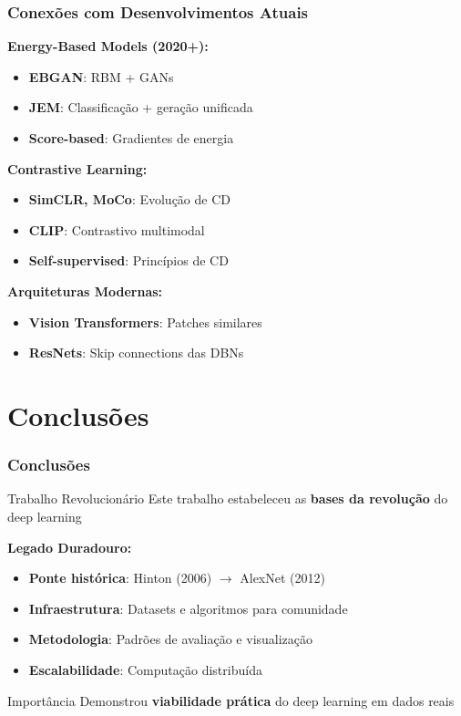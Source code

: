 \documentclass[aspectratio=169]{beamer}
\begin{document}
\begin{frame}
\frametitle{Conexões com Desenvolvimentos Atuais}
\textbf{Energy-Based Models (2020+):}
\begin{itemize}
    \item \textcolor{azulescuro}{\textbf{EBGAN}}: RBM + GANs
    \item \textcolor{azulescuro}{\textbf{JEM}}: Classificação + geração unificada
    \item \textcolor{azulescuro}{\textbf{Score-based}}: Gradientes de energia
\end{itemize}

\textbf{Contrastive Learning:}
\begin{itemize}
    \item \textcolor{azulescuro}{\textbf{SimCLR, MoCo}}: Evolução de CD
    \item \textcolor{azulescuro}{\textbf{CLIP}}: Contrastivo multimodal
    \item \textcolor{azulescuro}{\textbf{Self-supervised}}: Princípios de CD
\end{itemize}

\textbf{Arquiteturas Modernas:}
\begin{itemize}
    \item \textcolor{azulescuro}{\textbf{Vision Transformers}}: Patches similares
    \item \textcolor{azulescuro}{\textbf{ResNets}}: Skip connections das DBNs
\end{itemize}
\end{frame}

\section{Conclusões}

\begin{frame}
\frametitle{Conclusões}
\begin{alertblock}{Trabalho Revolucionário}
Este trabalho estabeleceu as \textcolor{azulescuro}{\textbf{bases da revolução}} do deep learning
\end{alertblock}

\textbf{Legado Duradouro:}
\begin{itemize}
    \item \textcolor{azulescuro}{\textbf{Ponte histórica}}: Hinton (2006) $\rightarrow$ AlexNet (2012)
    \item \textcolor{azulescuro}{\textbf{Infraestrutura}}: Datasets e algoritmos para comunidade
    \item \textcolor{azulescuro}{\textbf{Metodologia}}: Padrões de avaliação e visualização
    \item \textcolor{azulescuro}{\textbf{Escalabilidade}}: Computação distribuída
\end{itemize}

\begin{exampleblock}{Importância}
Demonstrou \textcolor{azulescuro}{\textbf{viabilidade prática}} do deep learning em dados reais
\end{exampleblock}
\end{frame}
\end{document}
